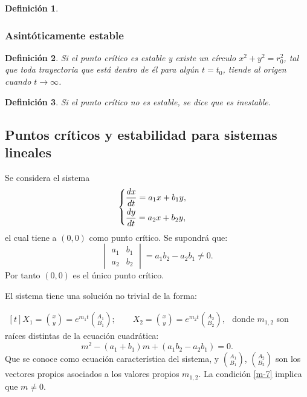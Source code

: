 \documentclass[a5paper,doc,10pt,noapacite]{apa6}
\newtheorem{definicion}{Definición}
\begin{document}
{{\begin{definicion}
\begin{figure}[H]
		\caption{}
		\label{fig:M-10}
	\end{figure}
\end{definicion}

\subsubsection{Asintóticamente estable}

\begin{definicion}
	Si el punto crítico es estable y existe un círculo \(x^2+y^2=r_0^2\), tal que toda trayectoria que está dentro de él para algún \(t=t_0\), tiende al origen cuando \(t\to\infty\).
\end{definicion}


\begin{definicion}
	Si el punto crítico no es estable, se dice que es inestable.
\end{definicion}






\newpage

%
%
%
\subsection{Puntos críticos y estabilidad para sistemas lineales}
%
%
%

Se considera el sistema
\begin{equation}\label{m-6}
	\begin{cases}
		\dfrac{dx}{dt}=a_1 x + b_1 y,\vspace{0.3em}
		\\
		\dfrac{dy}{dt}=a_2 x + b_2 y,
	\end{cases}
\end{equation}
el cual tiene  a \((0,0)\) como punto crítico. Se supondrá que:
\begin{equation}\label{m-7}
	\begin{vmatrix}
		a_1	&	b_1	\\
		a_2	&	b_2
	\end{vmatrix}
	=	a_1b_2-a_2b_1\neq 0.
\end{equation}
Por tanto \((0,0)\) es el único punto crítico.

El sistema tiene una solución no trivial de la forma:
\vspace{0.5\baselineskip}
\begin{APAenumerate}
	\item \( \begin{aligned}[t]
	X_1 = \binom{x}{y}
		= e^{m_1 t } \binom{A_1}{B_1}
	;
	\qquad
	X_2 = \binom{x}{y}
		= e^{m_2 t } \binom{A_2}{B_2},
	\end{aligned}
	\)
	donde \(m_{1,2}\) son raíces distintas de la ecuación cuadrática: 
	\begin{equation}\label{m-8}
		m^2-(a_1+b_1)m+(a_1b_2-a_2b_1)=0.
	\end{equation}
	Que se conoce como ecuación característica del sistema, y \(\binom{A_1}{B_1}\), \(\binom{A_2}{B_2}\) son los vectores propios asociados a los valores propios \(m_{1,2}\). La condición \eqref{m-7} implica que \(m\neq 0\).
	

\end{APAenumerate}}}
\end{document}
